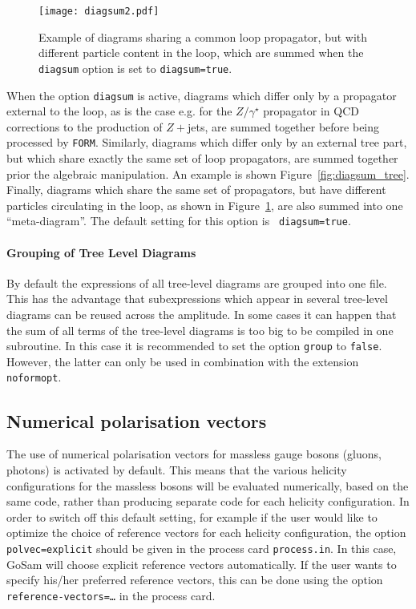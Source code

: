 \documentclass[11pt,a4paper]{refrep}
\newcommand{\gosam}{{\sc GoSam}\xspace}
\newcommand{\form}{{\tt FORM}\xspace}
\begin{document}
\begin{figure}[htb]
\centering
\texttt{[image: diagsum2.pdf]}
\caption{Example of diagrams sharing a common loop propagator, 
but with different particle content in the loop, which are summed when
the {\tt diagsum} option is set to {\tt diagsum=true}.}
\label{fig:diagsum_particle}
\end{figure} 


When the option {\tt diagsum} is active, diagrams which differ only by
a propagator external to the loop, as is the case e.g. for the
$Z/\gamma^\star$ propagator in QCD corrections to the production of
$Z+$jets, are summed together before being processed
by \form{}. Similarly, diagrams which differ only by an external tree
part, but which share exactly the same set of loop propagators, are
summed together prior the algebraic manipulation. An example is shown
Figure~\ref{fig:diagsum_tree}. Finally, diagrams which share the same
set of propagators, but have different particles circulating in the
loop, as shown in Figure~\ref{fig:diagsum_particle}, are also summed
into one ``meta-diagram''. The default setting for this option is {\tt
diagsum=true}.


\paragraph{Grouping of Tree Level Diagrams}

By default the expressions of all tree-level diagrams are grouped into one
file. This has the advantage that subexpressions which appear in several
tree-level diagrams can be reused across the amplitude. In some cases
it can happen that the sum of all terms of the tree-level diagrams is too big
to be compiled in one subroutine. In this case it is recommended to set
the option \texttt{group} to \texttt{false}. 
However, the latter can only be used in combination with the extension {\tt noformopt}.

\subsection{Numerical polarisation vectors}
\label{sec:numpolvec}
The use of numerical polarisation vectors for massless gauge bosons
(gluons, photons) is activated by default.  This means that the
various helicity configurations for the massless bosons will be
evaluated numerically, based on the same code, rather than producing
separate code for each helicity configuration.  In order to switch off
this default setting,
for example if the user would like to 
optimize the choice of reference vectors for each helicity configuration,
the option {\tt polvec=explicit} should be given in the process card 
{\tt process.in}.
In this case, \gosam{} will choose explicit reference vectors automatically.
If the user wants to specify his/her preferred reference vectors, 
this can be done using the option {\tt reference-vectors=\ldots}
in the process card.
\end{document}
